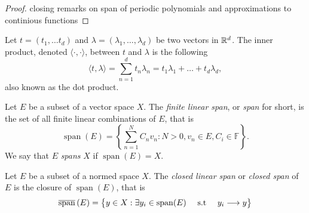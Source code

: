 \documentclass[../thesis.tex]{subfiles}
\begin{document}
\begin{proof}
closing remarks on span of periodic polynomials and approximations to continious functions
\end{proof}



\begin{definition}\label{def:dot_prod}
    Let $t=(t_1,\dots t_d)$ and $\lambda=(\lambda_1, \dots, \lambda_d)$ be two vectors in $\mathbb{R}^d$. The inner product, denoted $\langle \cdot, \cdot \rangle$, between $t$ and $\lambda$ is the following 
    \begin{equation}
        \langle t, \lambda \rangle = \sum_{n=1}^d t_n \lambda_n = t_1\lambda_1 + \dots + t_d\lambda_d,
    \end{equation}
    also known as the dot product. 
\end{definition}


\begin{definition}[Span]\label{def:span}
    Let $E$ be a subset of a vector space $X$. The \emph{finite linear span}, or \emph{span} for short, is the set of all finite linear combinations of $E$, that is
    \begin{equation*}
        \operatorname{span}(E)=\left\{\sum_{n=1}^N C_n v_n : N>0, v_n \in E, C_i \in \mathbb{F}\right\}.
    \end{equation*}
    We say that $E$ \emph{spans} $X$ if $\operatorname{span}(E) = X$.
\end{definition}


\begin{definition}\label{def:closed_span}
    Let $E$ be a subset of a normed space $X$. The \emph{closed linear span} or \emph{closed span} of $E$ is the closure of $\operatorname{span}(E)$, that is
    \begin{equation*}
        \overline{\operatorname{span}}\left( E \right) = \big\{y\in X: \exists y_i\in \operatorname{span}(E) \quad \text{ s.t } \quad y_i \longrightarrow y \big\}
    \end{equation*}
\end{definition}
\end{document}
